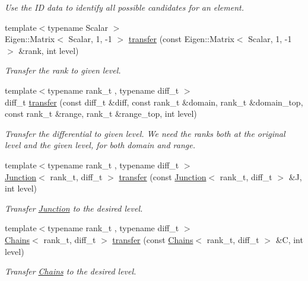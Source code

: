 \begin{DoxyCompactItemize}
\begin{DoxyCompactList}\small\item\em Use the ID data to identify all possible candidates for an element. \end{DoxyCompactList}\item 
{\footnotesize template$<$typename Scalar $>$ }\\Eigen\+::\+Matrix$<$ Scalar, 1, -\/1 $>$ \hyperlink{namespaceMackey_a671613d53fc3b0c9c4b115bc8b2797e6}{transfer} (const Eigen\+::\+Matrix$<$ Scalar, 1, -\/1 $>$ \&rank, int level)
\begin{DoxyCompactList}\small\item\em Transfer the rank to given level. \end{DoxyCompactList}\item 
{\footnotesize template$<$typename rank\+\_\+t , typename diff\+\_\+t $>$ }\\diff\+\_\+t \hyperlink{namespaceMackey_ad7524839b58c80d4b2c54827e4833b12}{transfer} (const diff\+\_\+t \&diff, const rank\+\_\+t \&domain, rank\+\_\+t \&domain\+\_\+top, const rank\+\_\+t \&range, rank\+\_\+t \&range\+\_\+top, int level)
\begin{DoxyCompactList}\small\item\em Transfer the differential to given level. We need the ranks both at the original level and the given level, for both domain and range. \end{DoxyCompactList}\item 
{\footnotesize template$<$typename rank\+\_\+t , typename diff\+\_\+t $>$ }\\\hyperlink{classMackey_1_1Junction}{Junction}$<$ rank\+\_\+t, diff\+\_\+t $>$ \hyperlink{namespaceMackey_a914aba7f868e67ae3fd9da3995678660}{transfer} (const \hyperlink{classMackey_1_1Junction}{Junction}$<$ rank\+\_\+t, diff\+\_\+t $>$ \&J, int level)
\begin{DoxyCompactList}\small\item\em Transfer \hyperlink{classMackey_1_1Junction}{Junction} to the desired level. \end{DoxyCompactList}\item 
{\footnotesize template$<$typename rank\+\_\+t , typename diff\+\_\+t $>$ }\\\hyperlink{classMackey_1_1Chains}{Chains}$<$ rank\+\_\+t, diff\+\_\+t $>$ \hyperlink{namespaceMackey_a50837580391b5c6705e23c637d742b22}{transfer} (const \hyperlink{classMackey_1_1Chains}{Chains}$<$ rank\+\_\+t, diff\+\_\+t $>$ \&C, int level)
\begin{DoxyCompactList}\small\item\em Transfer \hyperlink{classMackey_1_1Chains}{Chains} to the desired level. \end{DoxyCompactList}\item 

\end{DoxyCompactItemize}
